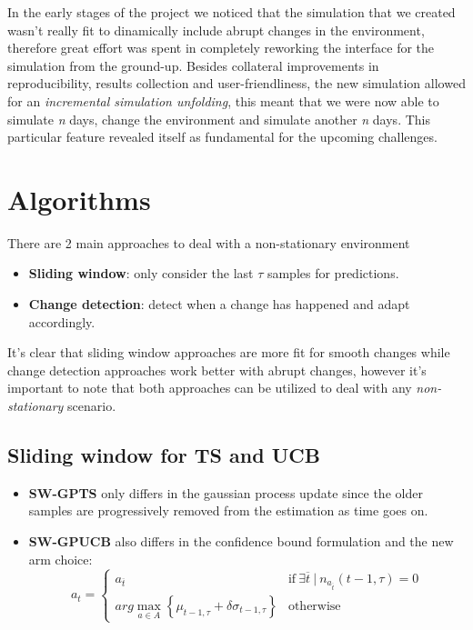 In the early stages of the project we noticed that the simulation that we created wasn't really fit to dinamically include abrupt changes in the environment, therefore great effort was spent in completely reworking the interface for the simulation from the ground-up.
Besides collateral improvements in reproducibility, results collection and user-friendliness, the new simulation allowed for an \textit{incremental simulation unfolding}, this meant that we were now able to simulate \textit{n} days, change the environment and simulate another \textit{n} days.
This particular feature revealed itself as fundamental for the upcoming challenges.

\section{Algorithms}
\label{sec:ns_demand_alg}

There are 2 main approaches to deal with a non-stationary environment

\begin{itemize}
    \item \textbf{Sliding window}: only consider the last $\tau$ samples for predictions.
    \item \textbf{Change detection}: detect when a change has happened and adapt accordingly.
\end{itemize}

It's clear that sliding window approaches are more fit for smooth changes while change detection approaches work better with abrupt changes, however it's important to note that both approaches can be utilized to deal with any \textit{non-stationary} scenario.

\subsection{Sliding window for TS and UCB}

\begin{itemize}
    \item \textbf{SW-GPTS} only differs in the gaussian process update since the older samples are progressively removed from the estimation as time goes on.
    \item \textbf{SW-GPUCB} also differs in the confidence bound formulation and the new arm choice:
        \begin{displaymath}
            a_t =
            \begin{cases}
                a_{\overline{t}} & \text{if} ~ \exists \overline{t} ~ | ~ n_{a_{\overline{t}}}(t-1, \tau) = 0 \\
                arg\max_{a \in A} \left\{ \mu_{t-1, \tau} + \delta \sigma_{t-1, \tau} \right\} & \text{otherwise}
            \end{cases}
        \end{displaymath}
\end{itemize}

